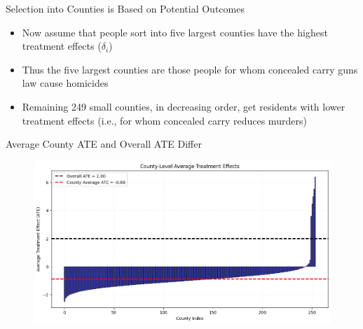 \documentclass{beamer}
\begin{document}
\begin{frame}{Selection into Counties is Based on Potential Outcomes}

\begin{itemize}
\item Now assume that people sort into five largest counties have the highest treatment effects ($\delta_i$)
\item Thus the five largest counties are those people for whom concealed carry guns law cause homicides
\item Remaining 249 small counties, in decreasing order, get residents with lower treatment effects (i.e., for whom concealed carry reduces murders)
\end{itemize}

\end{frame}

\begin{frame}{Average County ATE and Overall ATE Differ }

\begin{figure}
    \centering
    \includegraphics[height=0.7\textheight]{./lecture_includes/tiebout_roy2}
\end{figure}

\end{frame}
\end{document}
